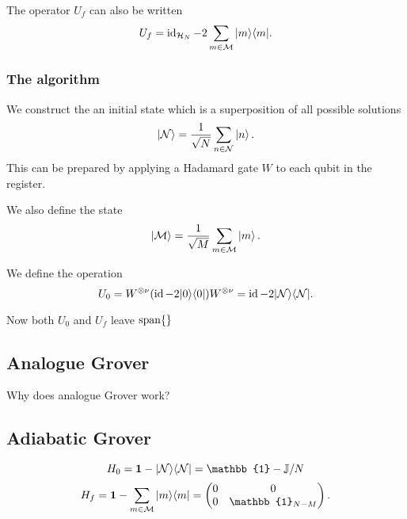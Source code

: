 The operator $U_f$ can also be written
\[ U_f = \operatorname{id}_{\mathcal{H}_N} - 2\sum_{m\in\mathcal{M}}|m\rangle\langle m|. \]

\subsubsection{The algorithm}
We construct the an initial state which is a superposition of all possible solutions
\[ \left| \mathcal{N} \right\rangle = \frac{1}{\sqrt{N}}\sum_{n\in\mathcal{N}}\left| n \right\rangle. \]
This can be prepared by applying a Hadamard gate $W$ to each qubit in the register.

We also define the state
\[ \left| \mathcal{M} \right\rangle = \frac{1}{\sqrt{M}}\sum_{m\in\mathcal{M}}\left| m \right\rangle. \]

We define the operation
\[ U_0 = W^{\otimes\nu}(\operatorname{id} - 2|0\rangle\langle0|)W^{\otimes\nu}= \operatorname{id} - 2|\mathcal{N}\rangle\langle\mathcal{N}|. \]

Now both $U_0$ and $U_f$ leave $\operatorname{span}\{\}$

\subsection{Analogue Grover}
Why does analogue Grover work?


\subsection{Adiabatic Grover}
\[ H_0 = \vec{1} - \ketbra{\mathcal{N}}{\mathcal{N}} = \mathbb{1}-\mathbb{J}/N \]
\[ H_f = \vec{1} - \sum_{m\in\mathcal{M}}\ketbra{m}{m} = \begin{pmatrix}
0 & 0 \\ 0 & \mathbb{1}_{N-M}
\end{pmatrix}.\]

